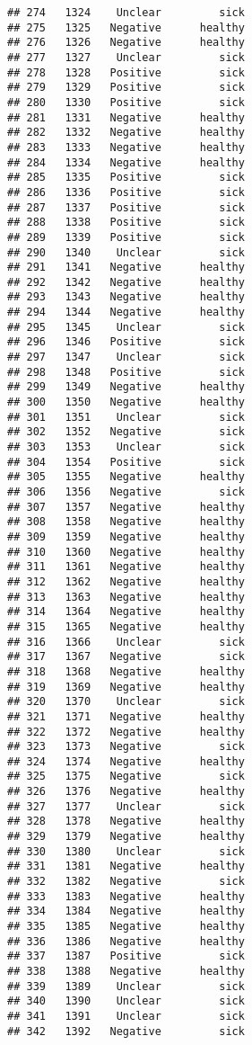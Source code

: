 \documentclass[
]{article}
\begin{document}
\begin{verbatim}
## 274   1324    Unclear         sick
## 275   1325   Negative      healthy
## 276   1326   Negative      healthy
## 277   1327    Unclear         sick
## 278   1328   Positive         sick
## 279   1329   Positive         sick
## 280   1330   Positive         sick
## 281   1331   Negative      healthy
## 282   1332   Negative      healthy
## 283   1333   Negative      healthy
## 284   1334   Negative      healthy
## 285   1335   Positive         sick
## 286   1336   Positive         sick
## 287   1337   Positive         sick
## 288   1338   Positive         sick
## 289   1339   Positive         sick
## 290   1340    Unclear         sick
## 291   1341   Negative      healthy
## 292   1342   Negative      healthy
## 293   1343   Negative      healthy
## 294   1344   Negative      healthy
## 295   1345    Unclear         sick
## 296   1346   Positive         sick
## 297   1347    Unclear         sick
## 298   1348   Positive         sick
## 299   1349   Negative      healthy
## 300   1350   Negative      healthy
## 301   1351    Unclear         sick
## 302   1352   Negative         sick
## 303   1353    Unclear         sick
## 304   1354   Positive         sick
## 305   1355   Negative      healthy
## 306   1356   Negative         sick
## 307   1357   Negative      healthy
## 308   1358   Negative      healthy
## 309   1359   Negative      healthy
## 310   1360   Negative      healthy
## 311   1361   Negative      healthy
## 312   1362   Negative      healthy
## 313   1363   Negative      healthy
## 314   1364   Negative      healthy
## 315   1365   Negative      healthy
## 316   1366    Unclear         sick
## 317   1367   Negative         sick
## 318   1368   Negative      healthy
## 319   1369   Negative      healthy
## 320   1370    Unclear         sick
## 321   1371   Negative      healthy
## 322   1372   Negative      healthy
## 323   1373   Negative         sick
## 324   1374   Negative      healthy
## 325   1375   Negative         sick
## 326   1376   Negative      healthy
## 327   1377    Unclear         sick
## 328   1378   Negative      healthy
## 329   1379   Negative      healthy
## 330   1380    Unclear         sick
## 331   1381   Negative      healthy
## 332   1382   Negative         sick
## 333   1383   Negative      healthy
## 334   1384   Negative      healthy
## 335   1385   Negative      healthy
## 336   1386   Negative      healthy
## 337   1387   Positive         sick
## 338   1388   Negative      healthy
## 339   1389    Unclear         sick
## 340   1390    Unclear         sick
## 341   1391    Unclear         sick
## 342   1392   Negative         sick

\end{verbatim}
\end{document}
